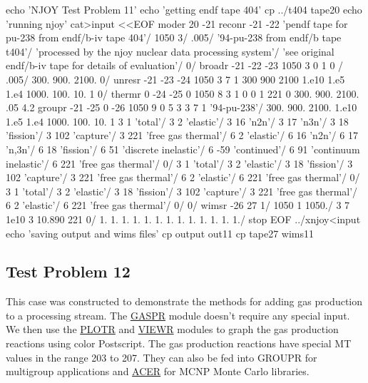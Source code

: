 \small
\begin{ccode}

echo 'NJOY Test Problem 11'
echo 'getting endf tape 404'
cp ../t404 tape20
echo 'running njoy'
cat>input <<EOF
 moder
 20 -21
 reconr
 -21 -22
 'pendf tape for pu-238 from endf/b-iv tape 404'/
 1050 3/
 .005/
 '94-pu-238 from endf/b tape t404'/
 'processed by the njoy nuclear data processing system'/
 'see original endf/b-iv tape for details of evaluation'/
 0/
 broadr
 -21 -22 -23
 1050 3 0 1 0 /
 .005/
 300. 900. 2100.
 0/
 unresr
 -21 -23 -24
 1050 3 7 1
 300 900 2100
 1.e10 1.e5 1.e4 1000. 100. 10. 1
 0/
 thermr
 0 -24 -25
 0 1050 8 3 1 0 0 1 221 0
 300. 900. 2100.
 .05 4.2
 groupr
 -21 -25 0 -26
 1050 9 0 5 3 3 7 1
 '94-pu-238'/
 300. 900. 2100.
 1.e10 1.e5 1.e4 1000. 100. 10. 1
 3 1 'total'/
 3 2 'elastic'/
 3 16 'n2n'/
 3 17 'n3n'/
 3 18 'fission'/
 3 102 'capture'/
 3 221 'free gas thermal'/
 6 2 'elastic'/
 6 16 'n2n'/
 6 17 'n,3n'/
 6 18 'fission'/
 6 51 'discrete inelastic'/
 6 -59 'continued'/
 6 91 'continuum inelastic'/
 6 221 'free gas thermal'/
 0/
 3 1 'total'/
 3 2 'elastic'/
 3 18 'fission'/
 3 102 'capture'/
 3 221 'free gas thermal'/
 6 2 'elastic'/
 6 221 'free gas thermal'/
 0/
 3 1 'total'/
 3 2 'elastic'/
 3 18 'fission'/
 3 102 'capture'/
 3 221 'free gas thermal'/
 6 2 'elastic'/
 6 221 'free gas thermal'/
 0/
 0/
 wimsr
 -26 27
 1/
 1050 1 1050./
 3 7 1e10 3 10.890 221 0/
 1. 1. 1. 1. 1. 1. 1. 1. 1. 1. 1. 1. 1./
 stop
EOF
../xnjoy<input
echo 'saving output and wims files'
cp output out11
cp tape27 wims11

\end{ccode}
\normalsize

\subsection{Test Problem 12}
\label{ssMandT_12}

This case was constructed to demonstrate the methods for adding
gas production to a processing stream.  The
\hyperlink{sGASPRhy}{GASPR} module doesn't
require any special input.  We then use the
\hyperlink{sPLOTRhy}{PLOTR} and \hyperlink{sVIEWRhy}{VIEWR}
modules to graph the gas production reactions using color
Postscript.  The gas production reactions have special MT
values in the range 203 to 207.  They can also be fed into
GROUPR for multigroup applications and
\hyperlink{sACERhy}{ACER} for MCNP Monte Carlo libraries.

